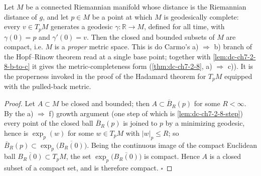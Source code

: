 \begin{lemma}
  \label{lem:dc-ch7-2-8-a-to-b}
  \leanok
  Let $M$ be a connected Riemannian manifold whose distance is the Riemannian distance of
  $g$, and let $p\in M$ be a point at which $M$ is geodesically complete: every $v\in T_pM$
  generates a geodesic $\gamma:\mathbb R\to M$, defined for all time, with $\gamma(0)=p$ and
  $\gamma'(0)=v$. Then the closed and bounded subsets of $M$ are compact, i.e. $M$ is a
  \emph{proper} metric space. This is do Carmo's a) $\Rightarrow$ b) branch of the
  Hopf--Rinow theorem read at a single base point; together with
  \cref{lem:dc-ch7-2-8-b-to-c} it gives the metric-completeness form
  (\cref{thm:dc-ch7-2-8}, a) $\Rightarrow$ c)). It is the properness invoked in the proof of
  the Hadamard theorem for $T_pM$ equipped with the pulled-back metric.
\end{lemma}
\begin{proof}
  \leanok
  Let $A\subset M$ be closed and bounded; then $A\subset\overline B_R(p)$ for some
  $R<\infty$. By the a) $\Rightarrow$ f) growth argument (one step of which is
  \cref{lem:dc-ch7-2-8-step}) every point of the closed ball $\overline B_R(p)$ is joined to
  $p$ by a minimizing geodesic, hence is $\exp_p(w)$ for some $w\in T_pM$ with $|w|_p\le R$;
  so $\overline B_R(p)\subset\exp_p\big(\overline{B_R(0)}\big)$. Being the continuous image
  of the compact Euclidean ball $\overline{B_R(0)}\subset T_pM$, the set
  $\exp_p\big(\overline{B_R(0)}\big)$ is compact. Hence $A$ is a closed subset of a compact
  set, and is therefore compact. $\square$
\end{proof}

